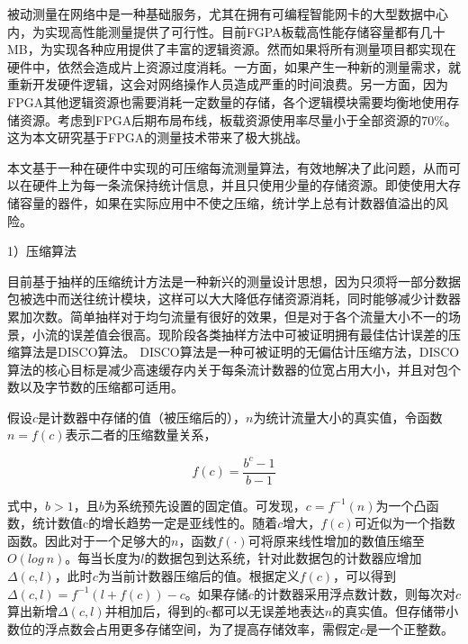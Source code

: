 \label{chap352}

被动测量在网络中是一种基础服务，尤其在拥有可编程智能网卡的大型数据中心内，为实现高性能测量提供了可行性。目前FGPA板载高性能存储容量都有几十MB，为实现各种应用提供了丰富的逻辑资源。然而如果将所有测量项目都实现在硬件中，依然会造成片上资源过度消耗。一方面，如果产生一种新的测量需求，就重新开发硬件逻辑，这会对网络操作人员造成严重的时间浪费。另一方面，因为FPGA其他逻辑资源也需要消耗一定数量的存储，各个逻辑模块需要均衡地使用存储资源。考虑到FPGA后期布局布线，板载资源使用率尽量小于全部资源的70\%。这为本文研究基于FPGA的测量技术带来了极大挑战。

本文基于一种在硬件中实现的可压缩每流测量算法，有效地解决了此问题，从而可以在硬件上为每一条流保持统计信息，并且只使用少量的存储资源。即使使用大存储容量的器件，如果在实际应用中不使之压缩，统计学上总有计数器值溢出的风险。

\label{chap353}

1）压缩算法

目前基于抽样的压缩统计方法是一种新兴的测量设计思想，因为只须将一部分数据包被选中而送往统计模块，这样可以大大降低存储资源消耗，同时能够减少计数器累加次数。简单抽样对于均匀流量有很好的效果，但是对于各个流量大小不一的场景，小流的误差值会很高。现阶段各类抽样方法中可被证明拥有最佳估计误差的压缩算法是DISCO算法。
DISCO算法是一种可被证明的无偏估计压缩方法，DISCO算法的核心目标是减少高速缓存内关于每条流计数器的位宽占用大小，并且对包个数以及字节数的压缩都可适用。

假设$ c $是计数器中存储的值（被压缩后的），$ n $为统计流量大小的真实值，令函数$ n=f(c) $表示二者的压缩数量关系，

\begin{equation} \label{discofunc}
f(c)=\frac{b^c-1}{b-1}
\end{equation}

式中，$ b>1 $，且$ b $为系统预先设置的固定值。可发现，$ c=f^{-1}(n) $为一个凸函数，统计数值c的增长趋势一定是亚线性的。随着$ c $增大，$ f(c) $可近似为一个指数函数。因此对于一个足够大的$ n $，函数$ f(\cdot) $可将原来线性增加的数值压缩至$ O(log~n) $。每当长度为$ l $的数据包到达系统，针对此数据包的计数器应增加$ \Delta(c,l) $，此时$ c $为当前计数器压缩后的值。根据定义$ f(c) $，可以得到$ \Delta(c,l)=f^{-1}(l+f(c))-c $。如果存储$ c $的计数器采用浮点数计数，则每次对$ c $算出新增$ \Delta(c,l) $并相加后，得到的c都可以无误差地表达$ n $的真实值。但存储带小数位的浮点数会占用更多存储空间，为了提高存储效率，需假定$ c $是一个正整数。



